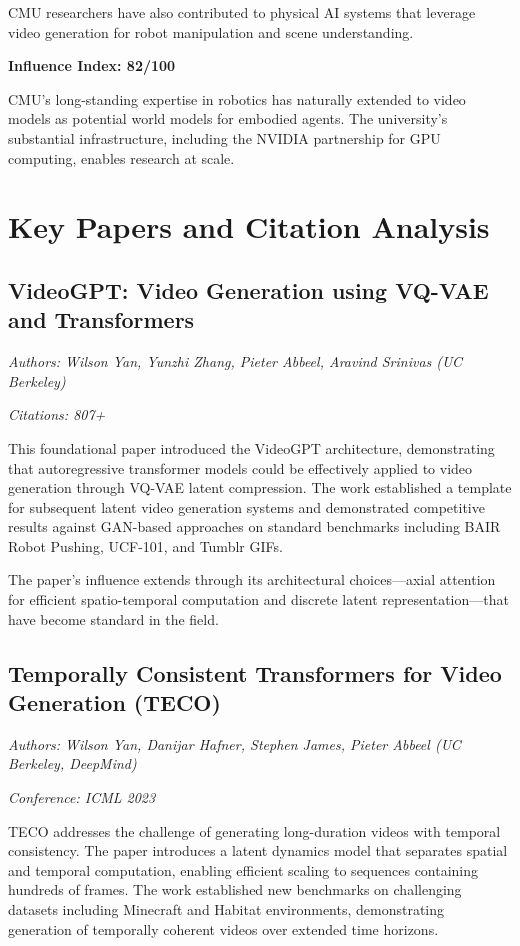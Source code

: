 CMU researchers have also contributed to physical AI systems that leverage video generation for robot manipulation and scene understanding.

\textbf{Influence Index: 82/100}

CMU's long-standing expertise in robotics has naturally extended to video models as potential world models for embodied agents. The university's substantial infrastructure, including the NVIDIA partnership for GPU computing, enables research at scale.

\section{Key Papers and Citation Analysis}

\subsection{VideoGPT: Video Generation using VQ-VAE and Transformers}

\textit{Authors: Wilson Yan, Yunzhi Zhang, Pieter Abbeel, Aravind Srinivas (UC Berkeley)}

\textit{Citations: 807+}

This foundational paper introduced the VideoGPT architecture, demonstrating that autoregressive transformer models could be effectively applied to video generation through VQ-VAE latent compression. The work established a template for subsequent latent video generation systems and demonstrated competitive results against GAN-based approaches on standard benchmarks including BAIR Robot Pushing, UCF-101, and Tumblr GIFs.

The paper's influence extends through its architectural choices—axial attention for efficient spatio-temporal computation and discrete latent representation—that have become standard in the field.

\subsection{Temporally Consistent Transformers for Video Generation (TECO)}

\textit{Authors: Wilson Yan, Danijar Hafner, Stephen James, Pieter Abbeel (UC Berkeley, DeepMind)}

\textit{Conference: ICML 2023}

TECO addresses the challenge of generating long-duration videos with temporal consistency. The paper introduces a latent dynamics model that separates spatial and temporal computation, enabling efficient scaling to sequences containing hundreds of frames. The work established new benchmarks on challenging datasets including Minecraft and Habitat environments, demonstrating generation of temporally coherent videos over extended time horizons.


